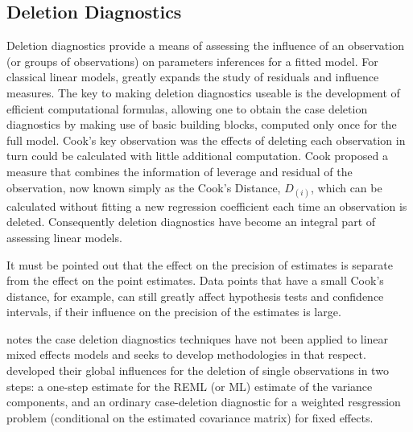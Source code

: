 \documentclass[12pt, a4paper]{report}
\theoremstyle{plain}
\theoremstyle{definition}
\theoremstyle{remark}
\begin{document}
	\subsection{Deletion Diagnostics}
	
	
	
	Deletion diagnostics provide a means of assessing the influence of an observation (or groups of observations) on parameters inferences for a fitted model. For classical linear models, \citet{cook77} greatly expands the study of residuals and influence measures. The key to making deletion diagnostics useable is the development of efficient computational formulas, allowing one to obtain the  case deletion diagnostics by making use of basic building blocks, computed only once for the full model.
	Cook's key observation was the effects of deleting each observation in turn could be calculated with little additional computation. Cook proposed a measure that combines the information of leverage and residual of the observation, now known simply as the Cook's Distance, $D_{(i)}$, which can be calculated without fitting a new regression coefficient each time an observation is deleted. Consequently deletion diagnostics have become an integral part of assessing linear models.
	
	
	
	It must be pointed out that the effect on the precision of estimates is separate from the effect on the point estimates. Data points that have a small Cook's distance, for example, can still greatly affect hypothesis tests and confidence intervals, if their 
	influence on the precision of the estimates is large.	
	
	\citet{Christensen} notes the case deletion diagnostics techniques have not been applied to linear mixed effects models and seeks to develop methodologies in that respect. \citet{Christensen} developed their global influences for the deletion of single observations in two steps: a one-step estimate for the REML (or ML) estimate of the variance components, and an ordinary case-deletion diagnostic for a weighted resgression problem (conditional on the estimated covariance matrix) for fixed effects.
	
\end{document}
